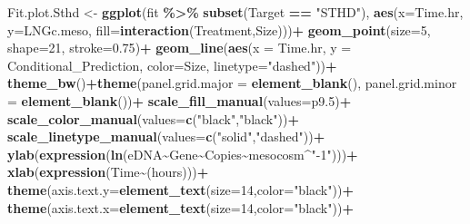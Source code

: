 \documentclass[
]{article}
\newenvironment{Shaded}{\begin{snugshade}}{\end{snugshade}}
\newcommand{\AttributeTok}[1]{\textcolor[rgb]{0.13,0.29,0.53}{#1}}
\newcommand{\DecValTok}[1]{\textcolor[rgb]{0.00,0.00,0.81}{#1}}
\newcommand{\FloatTok}[1]{\textcolor[rgb]{0.00,0.00,0.81}{#1}}
\newcommand{\FunctionTok}[1]{\textcolor[rgb]{0.13,0.29,0.53}{\textbf{#1}}}
\newcommand{\NormalTok}[1]{#1}
\newcommand{\OtherTok}[1]{\textcolor[rgb]{0.56,0.35,0.01}{#1}}
\newcommand{\SpecialCharTok}[1]{\textcolor[rgb]{0.81,0.36,0.00}{\textbf{#1}}}
\newcommand{\StringTok}[1]{\textcolor[rgb]{0.31,0.60,0.02}{#1}}
\begin{document}
\begin{Shaded}
\begin{Highlighting}[]
\NormalTok{Fit.plot.Sthd }\OtherTok{\textless{}{-}} \FunctionTok{ggplot}\NormalTok{(fit }\SpecialCharTok{\%\textgreater{}\%} \FunctionTok{subset}\NormalTok{(Target }\SpecialCharTok{==} \StringTok{"STHD"}\NormalTok{), }\FunctionTok{aes}\NormalTok{(}\AttributeTok{x=}\NormalTok{Time.hr, }\AttributeTok{y=}\NormalTok{LNGc.meso, }\AttributeTok{fill=}\FunctionTok{interaction}\NormalTok{(Treatment,Size)))}\SpecialCharTok{+}
  \FunctionTok{geom\_point}\NormalTok{(}\AttributeTok{size=}\DecValTok{5}\NormalTok{, }\AttributeTok{shape=}\DecValTok{21}\NormalTok{, }\AttributeTok{stroke=}\FloatTok{0.75}\NormalTok{)}\SpecialCharTok{+}
  \FunctionTok{geom\_line}\NormalTok{(}\FunctionTok{aes}\NormalTok{(}\AttributeTok{x =}\NormalTok{ Time.hr, }\AttributeTok{y =}\NormalTok{ Conditional\_Prediction, }\AttributeTok{color=}\NormalTok{Size, }\AttributeTok{linetype=}\StringTok{"dashed"}\NormalTok{))}\SpecialCharTok{+}
  \FunctionTok{theme\_bw}\NormalTok{()}\SpecialCharTok{+}\FunctionTok{theme}\NormalTok{(}\AttributeTok{panel.grid.major =} \FunctionTok{element\_blank}\NormalTok{(), }\AttributeTok{panel.grid.minor =} \FunctionTok{element\_blank}\NormalTok{())}\SpecialCharTok{+}
  \FunctionTok{scale\_fill\_manual}\NormalTok{(}\AttributeTok{values=}\NormalTok{p9}\FloatTok{.5}\NormalTok{)}\SpecialCharTok{+}
  \FunctionTok{scale\_color\_manual}\NormalTok{(}\AttributeTok{values=}\FunctionTok{c}\NormalTok{(}\StringTok{"black"}\NormalTok{,}\StringTok{"black"}\NormalTok{))}\SpecialCharTok{+}
  \FunctionTok{scale\_linetype\_manual}\NormalTok{(}\AttributeTok{values=}\FunctionTok{c}\NormalTok{(}\StringTok{"solid"}\NormalTok{,}\StringTok{"dashed"}\NormalTok{))}\SpecialCharTok{+}
  \FunctionTok{ylab}\NormalTok{(}\FunctionTok{expression}\NormalTok{(}\FunctionTok{ln}\NormalTok{(eDNA}\SpecialCharTok{\textasciitilde{}}\NormalTok{Gene}\SpecialCharTok{\textasciitilde{}}\NormalTok{Copies}\SpecialCharTok{\textasciitilde{}}\NormalTok{mesocosm}\SpecialCharTok{\^{}}\StringTok{"{-}1"}\NormalTok{)))}\SpecialCharTok{+}
  \FunctionTok{xlab}\NormalTok{(}\FunctionTok{expression}\NormalTok{(Time}\SpecialCharTok{\textasciitilde{}}\NormalTok{(hours)))}\SpecialCharTok{+}
  \FunctionTok{theme}\NormalTok{(}\AttributeTok{axis.text.y=}\FunctionTok{element\_text}\NormalTok{(}\AttributeTok{size=}\DecValTok{14}\NormalTok{,}\AttributeTok{color=}\StringTok{"black"}\NormalTok{))}\SpecialCharTok{+}
  \FunctionTok{theme}\NormalTok{(}\AttributeTok{axis.text.x=}\FunctionTok{element\_text}\NormalTok{(}\AttributeTok{size=}\DecValTok{14}\NormalTok{,}\AttributeTok{color=}\StringTok{"black"}\NormalTok{))}\SpecialCharTok{+}

\end{Highlighting}
\end{Shaded}
\end{document}

